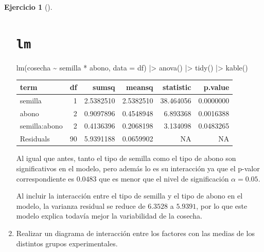 \documentclass[
  a4paper,
]{scrreport}
\newenvironment{Shaded}{\begin{snugshade}}{\end{snugshade}}
\newcommand{\AttributeTok}[1]{\textcolor[rgb]{0.40,0.45,0.13}{#1}}
\newcommand{\FunctionTok}[1]{\textcolor[rgb]{0.28,0.35,0.67}{#1}}
\newcommand{\NormalTok}[1]{\textcolor[rgb]{0.00,0.23,0.31}{#1}}
\newcommand{\SpecialCharTok}[1]{\textcolor[rgb]{0.37,0.37,0.37}{#1}}
\theoremstyle{definition}
\newtheorem{exercise}{Ejercicio}[chapter]
\theoremstyle{remark}
\begin{document}
\begin{exercise}[]
\begin{enumerate}
\begin{tcolorbox}
  \section{\texorpdfstring{\texttt{lm}}{lm}}

\begin{Shaded}
\begin{Highlighting}[]
\FunctionTok{lm}\NormalTok{(cosecha }\SpecialCharTok{\textasciitilde{}}\NormalTok{ semilla }\SpecialCharTok{*}\NormalTok{ abono, }\AttributeTok{data =}\NormalTok{ df) }\SpecialCharTok{|\textgreater{}} 
    \FunctionTok{anova}\NormalTok{() }\SpecialCharTok{|\textgreater{}} 
    \FunctionTok{tidy}\NormalTok{() }\SpecialCharTok{|\textgreater{}} 
    \FunctionTok{kable}\NormalTok{()}
\end{Highlighting}
\end{Shaded}

  \begin{longtable}[]{@{}lrrrrr@{}}
  \toprule\noalign{}
  term & df & sumsq & meansq & statistic & p.value \\
  \midrule\noalign{}
  \endhead
  \bottomrule\noalign{}
  \endlastfoot
  semilla & 1 & 2.5382510 & 2.5382510 & 38.464056 & 0.0000000 \\
  abono & 2 & 0.9097896 & 0.4548948 & 6.893368 & 0.0016388 \\
  semilla:abono & 2 & 0.4136396 & 0.2068198 & 3.134098 & 0.0483265 \\
  Residuals & 90 & 5.9391188 & 0.0659902 & NA & NA \\
  \end{longtable}

  Al igual que antes, tanto el tipo de semilla como el tipo de abono son
  significativos en el modelo, pero además lo es su interacción ya que
  el p-valor correspondiente es \(0.0483\) que es menor que el nivel de
  significación \(\alpha = 0.05\).

  Al incluir la interacción entre el tipo de semilla y el tipo de abono
  en el modelo, la varianza residual se reduce de \(6.3528\) a
  \(5.9391\), por lo que este modelo explica todavía mejor la
  variabilidad de la cosecha.

  \end{tcolorbox}
\item
  Realizar un diagrama de interacción entre los factores con las medias
  de los distintos grupos experimentales.

  \begin{tcolorbox}[enhanced jigsaw, colframe=quarto-callout-tip-color-frame, toprule=.15mm, bottomtitle=1mm, breakable, opacitybacktitle=0.6, toptitle=1mm, colback=white, bottomrule=.15mm, title=\textcolor{quarto-callout-tip-color}{\faLightbulb}\hspace{0.5em}{Solución}, arc=.35mm, left=2mm, titlerule=0mm, rightrule=.15mm, coltitle=black, leftrule=.75mm, opacityback=0, colbacktitle=quarto-callout-tip-color!10!white]


\end{tcolorbox}
\end{enumerate}
\end{exercise}
\end{document}
